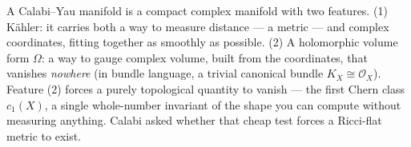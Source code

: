 \documentclass[12pt]{article}
\newcommand{\auterm}[1]{{\SansSemibold #1}}
\newcommand{\CenterBody}{\fontsize{25}{34.5}\selectfont}
\begin{document}
%
\begin{minipage}[t][\BodyH][s]{0.37\textwidth}
\CenterBody

A \auterm{Calabi--Yau manifold} is a compact complex manifold with two
features. \auterm{(1) K\"ahler:} it carries both a way to measure
distance --- a metric --- and complex coordinates, fitting together as
smoothly as possible. \auterm{(2) A holomorphic volume form} $\Omega$:
a way to gauge complex volume, built from the coordinates, that
vanishes \emph{nowhere} (in bundle language, a trivial canonical
bundle $K_X \cong \mathcal{O}_X$). Feature (2) forces a purely
\auterm{topological} quantity to vanish --- the \auterm{first Chern
class} $c_1(X)$, a single whole-number invariant of the shape you can
compute without measuring anything. Calabi asked whether that cheap
test forces a Ricci-flat metric to exist.
\par\vspace{0.35em}
{\setlength{\fboxrule}{1.5pt}\setlength{\fboxsep}{0pt}%
}
\end{minipage}
\end{document}
